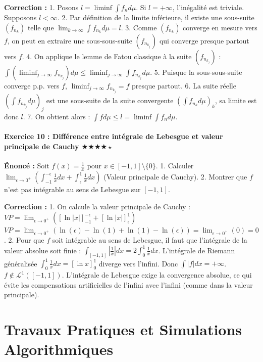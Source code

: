\documentclass[11pt,a4paper]{article}
\begin{document}
\textbf{Correction :}
1. Posons $l = \liminf \int f_n d\mu$. Si $l = +\infty$, l'inégalité est triviale. Supposons $l < \infty$.
2. Par définition de la limite inférieure, il existe une sous-suite $(f_{n_k})$ telle que $\lim_{k \to \infty} \int f_{n_k} d\mu = l$.
3. Comme $(f_{n_k})$ converge en mesure vers $f$, on peut en extraire une sous-sous-suite $(f_{n_{k_j}})$ qui converge presque partout vers $f$.
4. On applique le lemme de Fatou classique à la suite $(f_{n_{k_j}})$ :
   $\int (\liminf_{j \to \infty} f_{n_{k_j}}) d\mu \le \liminf_{j \to \infty} \int f_{n_{k_j}} d\mu$.
5. Puisque la sous-sous-suite converge p.p. vers $f$, $\liminf_{j \to \infty} f_{n_{k_j}} = f$ presque partout.
6. La suite réelle $(\int f_{n_{k_j}} d\mu)_j$ est une sous-suite de la suite convergente $(\int f_{n_k} d\mu)_k$, sa limite est donc $l$.
7. On obtient alors : $\int f d\mu \le l = \liminf \int f_n d\mu$.


\subsection*{Exercice 10 : Différence entre intégrale de Lebesgue et valeur principale de Cauchy \quad $\bigstar\bigstar\bigstar\bigstar\star$}
\textbf{Énoncé :}
Soit $f(x) = \frac{1}{x}$ pour $x \in [-1, 1] \setminus \{0\}$.
1. Calculer $\lim_{\epsilon \to 0^+} \left( \int_{-1}^{-\epsilon} \frac{1}{x} dx + \int_{\epsilon}^{1} \frac{1}{x} dx \right)$ (Valeur principale de Cauchy).
2. Montrer que $f$ n'est pas intégrable au sens de Lebesgue sur $[-1, 1]$.

\textbf{Correction :}
1. On calcule la valeur principale de Cauchy :
   $VP = \lim_{\epsilon \to 0^+} \left( [\ln |x|]_{-1}^{-\epsilon} + [\ln |x|]_{\epsilon}^{1} \right)$
   $VP = \lim_{\epsilon \to 0^+} \left( \ln(\epsilon) - \ln(1) + \ln(1) - \ln(\epsilon) \right) = \lim_{\epsilon \to 0^+} (0) = 0$.
2. Pour que $f$ soit intégrable au sens de Lebesgue, il faut que l'intégrale de la valeur absolue soit finie :
   $\int_{[-1, 1]} \left| \frac{1}{x} \right| dx = 2 \int_{0}^{1} \frac{1}{x} dx$.
   L'intégrale de Riemann généralisée $\int_{0}^{1} \frac{1}{x} dx = [\ln x]_0^1$ diverge vers l'infini.
   Donc $\int |f| dx = +\infty$. $f \notin \mathcal{L}^1([-1, 1])$.
L'intégrale de Lebesgue exige la convergence absolue, ce qui évite les compensations artificielles de l'infini avec l'infini (comme dans la valeur principale).


\newpage
\part{Travaux Pratiques et Simulations Algorithmiques}
\end{document}
